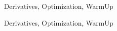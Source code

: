 \begin{tagblock}{Derivatives, Optimization, WarmUp}
\begin{question}
	
\begin{tags}
	   Derivatives, Optimization, WarmUp

\end{tags}
	
\begin{diary}
\end{diary}
	
\begin{solution}
	   
\end{solution}
	
\end{question}

\end{tagblock}


